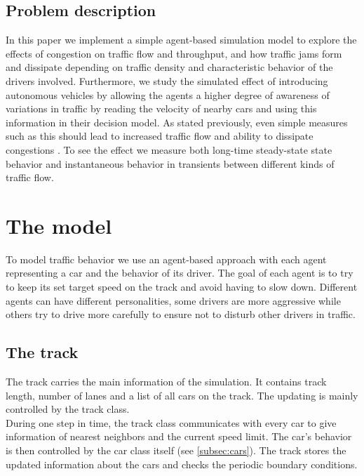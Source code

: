 \documentclass[11pt,a4paper,twocolumn]{article}
\begin{document}
\subsection{Problem description}
In this paper we implement a simple agent-based simulation model to explore the effects of congestion on traffic flow and throughput, and how traffic jams form and dissipate depending on traffic density and characteristic behavior of the drivers involved. Furthermore, we study the simulated effect of introducing autonomous vehicles by allowing the agents a higher degree of awareness of variations in traffic by reading the velocity of nearby cars and using this information in their decision model. As stated previously, even simple measures such as this should lead to increased traffic flow and ability to dissipate congestions \cite{stern17autonomous}. To see the effect we measure both long-time steady-state state behavior and instantaneous behavior in transients between different kinds of traffic flow.

\section{The model}
To model traffic behavior we use an agent-based approach with each agent representing a car and the behavior of its driver. The goal of each agent is to try to keep its set target speed on the track and avoid having to slow down. Different agents can have different personalities, some drivers are more aggressive while others try to drive more carefully to ensure not to disturb other drivers in traffic.

\subsection{The track}\label{subsec:track}
The track carries the main information of the simulation. It contains track length, number of lanes and a list of all cars on the track. The updating is mainly controlled by the track class.  \\
During one step in time, the track class communicates with every car to give information of nearest neighbors and the current speed limit. The car's behavior is then controlled by the car class itself (see \ref{subsec:cars}). The track stores the updated information about the cars and checks the periodic boundary conditions. \\
\end{document}
